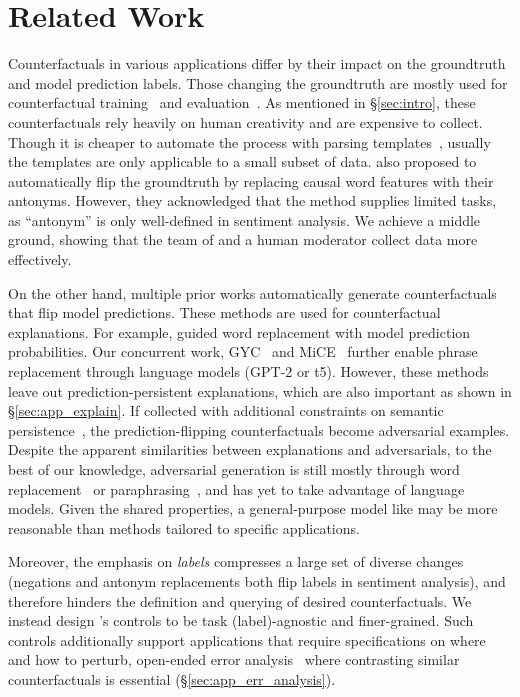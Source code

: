 \section{Related Work}
\label{sec:relate}

Counterfactuals in various applications differ by their impact on the groundtruth and model prediction labels.
Those changing the groundtruth are mostly used for counterfactual training~\cite{kaushik2019learning, teney2020learning} and evaluation~\cite{gardner2020contrast, checklist:acl20}.
As mentioned in \S\ref{sec:intro}, these counterfactuals rely heavily on human creativity and are expensive to collect.
Though it is cheaper to automate the process with parsing templates~\cite{li2020linguistically}, usually the templates are only applicable to a small subset of data.
\citet{wang2020robustness} also proposed to automatically flip the groundtruth by replacing causal word features with their antonyms.
However, they acknowledged that the method supplies limited tasks, as ``antonym'' is only well-defined in sentiment analysis.
We achieve a middle ground, showing that the team of \sysname and a human moderator collect data more effectively.

On the other hand, multiple prior works automatically generate counterfactuals that flip model predictions.
These methods are used for counterfactual explanations.
For example, \citet{kang2020counterfactual} guided word replacement with model prediction probabilities.
Our concurrent work, GYC~\cite{madaan2020generate} and MiCE~\cite{ross2020explaining} further enable phrase replacement through language models (GPT-2 or t5).
However, these methods leave out prediction-persistent explanations, which are also important as shown in \S\ref{sec:app_explain}.
If collected with additional constraints on semantic persistence~\cite{morris2020textattack, alzantot-etal-2018-generating}, the prediction-flipping counterfactuals become adversarial examples.
Despite the apparent similarities between explanations and adversarials, to the best of our knowledge, adversarial generation is still mostly through word replacement~\cite{alzantot2018generating, garg2020bae, li2020contextualized} or paraphrasing~\cite{iyyer2018adversarial, malandrakis-etal-2019-controlled}, and has yet to take advantage of language models.
Given the shared properties, a general-purpose model like \sysname may be more reasonable than methods tailored to specific applications.

Moreover, the emphasis on \emph{labels} compresses a large set of diverse changes (\eg negations and antonym replacements both flip labels in sentiment analysis), and therefore hinders the definition and querying of desired counterfactuals.
We instead design \sysname's controls to be task (label)-agnostic and finer-grained.
Such controls additionally support applications that require specifications on where and how to perturb, \eg open-ended error analysis~\cite{wu2019errudite} where contrasting similar counterfactuals is essential (\S\ref{sec:app_err_analysis}).


